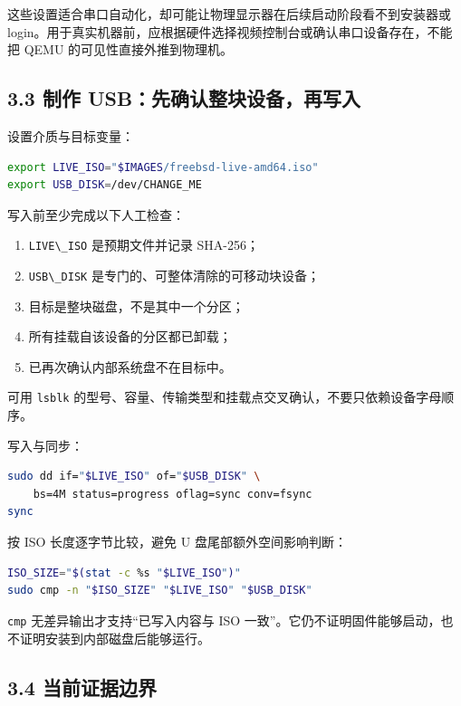 \documentclass[
  11pt,
  UTF8,
  a4paper,
  fontset=fandol]{ctexart}
\newcommand{\passthrough}[1]{#1}
\providecommand{\tightlist}{%
  \setlength{\itemsep}{0pt}\setlength{\parskip}{0pt}}
\begin{document}
这些设置适合串口自动化，却可能让物理显示器在后续启动阶段看不到安装器或
login。用于真实机器前，应根据硬件选择视频控制台或确认串口设备存在，不能把
QEMU 的可见性直接外推到物理机。

\subsection{3.3 制作
USB：先确认整块设备，再写入}\label{ux5236ux4f5c-usbux5148ux786eux8ba4ux6574ux5757ux8bbeux5907ux518dux5199ux5165}

设置介质与目标变量：

\begin{lstlisting}[language=sh]
export LIVE_ISO="$IMAGES/freebsd-live-amd64.iso"
export USB_DISK=/dev/CHANGE_ME
\end{lstlisting}

写入前至少完成以下人工检查：

\begin{enumerate}
\def\labelenumi{\arabic{enumi}.}
\tightlist
\item
  \passthrough{\lstinline!LIVE\_ISO!} 是预期文件并记录 SHA-256；
\item
  \passthrough{\lstinline!USB\_DISK!}
  是专门的、可整体清除的可移动块设备；
\item
  目标是整块磁盘，不是其中一个分区；
\item
  所有挂载自该设备的分区都已卸载；
\item
  已再次确认内部系统盘不在目标中。
\end{enumerate}

可用 \passthrough{\lstinline!lsblk!}
的型号、容量、传输类型和挂载点交叉确认，不要只依赖设备字母顺序。

写入与同步：

\begin{lstlisting}[language=sh]
sudo dd if="$LIVE_ISO" of="$USB_DISK" \
    bs=4M status=progress oflag=sync conv=fsync
sync
\end{lstlisting}

按 ISO 长度逐字节比较，避免 U 盘尾部额外空间影响判断：

\begin{lstlisting}[language=sh]
ISO_SIZE="$(stat -c %s "$LIVE_ISO")"
sudo cmp -n "$ISO_SIZE" "$LIVE_ISO" "$USB_DISK"
\end{lstlisting}

\passthrough{\lstinline!cmp!} 无差异输出才支持``已写入内容与 ISO
一致''。它仍不证明固件能够启动，也不证明安装到内部磁盘后能够运行。

\subsection{3.4
当前证据边界}\label{ux5f53ux524dux8bc1ux636eux8fb9ux754c}
\end{document}
